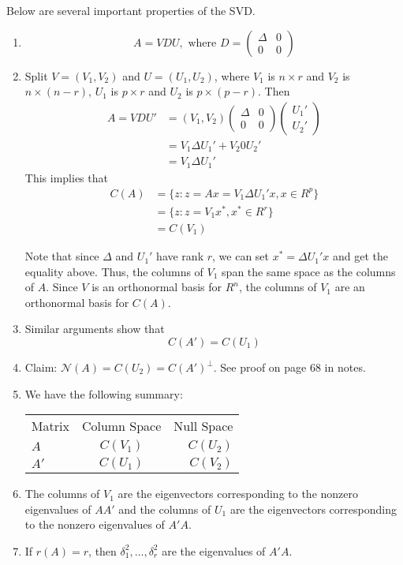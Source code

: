 \documentclass[12pt]{article}
\numberwithin{equation}{section}
\begin{document}
Below are several important properties of the SVD.
\begin{enumerate}
  \item \begin{equation*}
    A = VDU, \text{ where } 
    D = \begin{pmatrix}
      \Delta & 0 \\
      0 & 0
    \end{pmatrix}
  \end{equation*}
  \item Split $V = (V_1, V_2)$ and $U = (U_1, U_2)$, where $V_1$ is $n \times r$ and $V_2$ is $n \times (n - r)$, $U_1$ is $p \times r$ and $U_2$ is $p \times (p - r)$. Then
  \begin{align*}
    A = VDU' & = (V_1, V_2) 
    \begin{pmatrix} 
      \Delta & 0 \\ 0 & 0 
    \end{pmatrix}
    \begin{pmatrix}
      U_1' \\
      U_2'
    \end{pmatrix} \\
    &= V_1 \Delta U_1' + V_2 0 U_2' \\
    &= V_1 \Delta U_1'
  \end{align*}
  This implies that
  \begin{align*}
    C(A) &= \{z: z = Ax = V_1 \Delta U_1' x, x \in R^p \} \\
      &= \{z: z = V_1x^*, x^* \in R^r \} \\
      &= C(V_1)
    \end{align*}

  Note that since $\Delta$ and $U_1'$ have rank $r$, we can set $x^* = \Delta U_1' x$ and get the equality above. Thus, the columns of $V_1$ span the same space as the columns of $A$. Since $V$ is an orthonormal basis for $R^n$, the columns of $V_1$ are an orthonormal basis for $C(A)$.
  \item Similar arguments show that 
  \begin{equation*}
    C(A') = C(U_1)
  \end{equation*}
  \item Claim: $\mathcal{N}(A) = C(U_2) = C(A')^{\perp}$. See proof on page 68 in notes.
  \item We have the following summary:

  \begin{tabular}{ l c r }
    Matrix & Column Space & Null Space \\
    $A$ & $C(V_1)$ & $C(U_2)$ \\
    $A'$ & $C(U_1)$ & $C(V_2)$ \\
  \end{tabular}
  \item The columns of $V_1$ are the eigenvectors corresponding to the nonzero eigenvalues of $AA'$ and the columns of $U_1$ are the eigenvectors corresponding to the nonzero eigenvalues of $A'A$.
  \item If $r(A) = r$, then $\delta_1^2, \ldots, \delta_r^2$ are the eigenvalues of $A'A$.
\end{enumerate}
\end{document}
